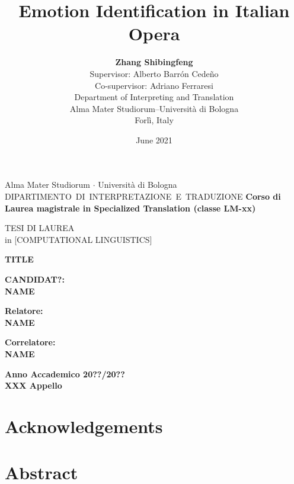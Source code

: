 \documentclass[12pt]{book}
\title{Emotion Identification in Italian Opera}
\author{\textbf{Zhang Shibingfeng}\\
Supervisor: Alberto Barr\'on Cede\~no \\
Co-supervisor: Adriano Ferraresi\\
Department of Interpreting and Translation\\
Alma Mater Studiorum--Universit\`a di Bologna\\
Forl\`i, Italy
}
\date{June 2021}
\renewcommand{\&}{\textup{\symbol{`\&}}}
\begin{document}
\begin{center}
{{\Large{Alma Mater Studiorum $\cdot$ Universit\`a di
Bologna\\}}}
\vspace{5mm}
\mbox{\large{DIPARTIMENTO DI INTERPRETAZIONE E TRADUZIONE}}
\vspace{5mm}
{\small{\bf Corso di Laurea magistrale in Specialized Translation (classe 
LM-xx) }}
\end{center}
\vspace{15mm}
\begin{center}
{TESI DI LAUREA\\in [COMPUTATIONAL LINGUISTICS]}
\end{center}

\vspace{15mm}
\begin{center}
\mbox{\LARGE{\bf TITLE}}
\end{center}
\vspace{35mm}
\par
\noindent
\begin{minipage}[t]{0.47\textwidth}
{\large{\bf CANDIDAT?:\\
NAME\\}}
\end{minipage}
\hfill
\begin{minipage}[t]{0.47\textwidth}\raggedleft
{\large{\bf Relatore:\\NAME
}}
\end{minipage}

\hfill
\begin{minipage}[t]{0.47\textwidth}\raggedleft
{\large{\bf Correlatore:\\
NAME}}
\end{minipage}

\vspace{20mm}
\begin{center}
{\bf Anno Accademico 20??/20??\\
XXX Appello}
\end{center}
\thispagestyle{empty}
\renewcommand{\thepage}{\roman{page}}%
\chapter*{Acknowledgements}
\thispagestyle{empty}



\chapter*{Abstract}
\end{document}

